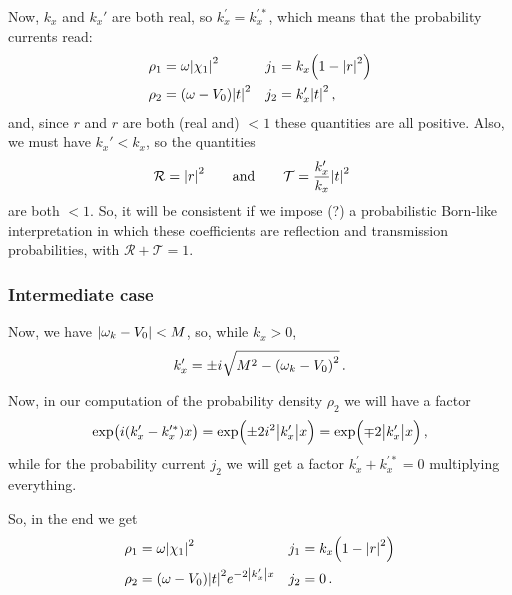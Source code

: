 \documentclass[main.tex]{subfiles}
\begin{document}
Now, \(k_x\) and \(k_x'\) are both real, so \(k_x^{\prime } = k_x^{\prime *}\), which means that the probability currents read: 
%
\begin{align}
\rho_1 &= \omega \abs{\chi_1 }^2
&
j_1 &= k_x \qty(1 - \abs{r}^2) \\
\rho_2 &= (\omega - V_0 ) \abs{t}^2 
&
j_2 &=  k_x^{\prime } \abs{t}^2 
\,,
\end{align}
%
and, since \(r\) and \(r\) are both (real and) \(<1\) these quantities are all positive. Also, we must have \(k_x' < k_x\), so the quantities 
%
\begin{align}
\mathcal{R} &= \abs{r}^2
\qquad \text{and} \qquad
\mathcal{T} = \frac{k_x'}{k_x} \abs{t}^2
\,
\end{align}
%
are both \(<1\). So, it will be consistent if we impose (?) a probabilistic Born-like interpretation in which these coefficients are reflection and transmission probabilities, with \(\mathcal{R} + \mathcal{T} = 1\).

\subsubsection{Intermediate case}

Now, we have \(\abs{\omega_{k} - V_0 } < M\), so, while \(k_x>0\), 
%
\begin{align}
k_x' = \pm i \sqrt{M^2 - \qty(\omega_{k} - V_0 )^2}
\,.
\end{align}


Now, in our computation of the probability density \(\rho_2 \) we will have a factor 
%
\begin{align}
\exp(i (k_x' - k_x^{\prime *})x) = \exp(\pm 2 i^2 \abs{k_x'}x) =  \exp(\mp 2 \abs{k_x^{\prime }} x)
\,,
\end{align}
%
while for the probability current \(j_2 \) we will get a factor \(k_x^{\prime } + k_x^{\prime *} = 0 \) multiplying everything.


So, in the end we get 
%
\begin{align}
\rho_1 &= \omega \abs{\chi_1 }^2
&
j_1 &= k_x \qty(1 - \abs{r}^2) \\
\rho_2 &= (\omega - V_0 ) \abs{t}^2 e^{-2 \abs{k_x^{\prime }} x}
&
j_2 &= 0 
\,.
\end{align}
\end{document}
